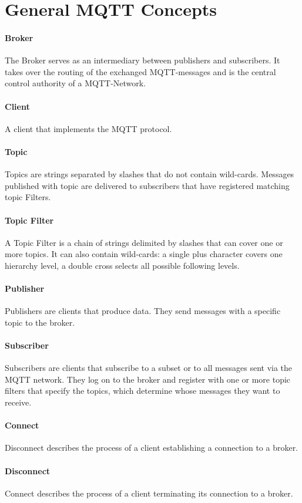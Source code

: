 \section{General MQTT Concepts}
\paragraph{Broker}
The Broker serves as an intermediary between publishers and subscribers.
It takes over the routing of the exchanged MQTT-messages and is the central control authority of a MQTT-Network.
\paragraph{Client}
A client that implements the MQTT protocol. 
\paragraph{Topic}
Topics are strings separated by slashes that do not contain wild-cards.
Messages published with topic are delivered to subscribers that have registered matching topic Filters.
\paragraph{Topic Filter}
A Topic Filter is a chain of strings delimited by slashes that 
can cover one or more topics. 
It can also contain wild-cards: a single plus character covers one hierarchy level, a double cross selects all possible following levels.
\paragraph{Publisher}
Publishers are clients that produce data.
They send messages with a specific topic to the broker.
\paragraph{Subscriber}
Subscribers are clients that subscribe to a subset or to all messages sent via the
MQTT network.
They log on to the broker and register with one or more topic filters that specify the topics, which determine whose messages they want to receive.
\paragraph{Connect}
Disconnect describes the process of a client establishing a connection to a broker.
\paragraph{Disconnect}
Connect describes the process of a client terminating its connection to a broker.


